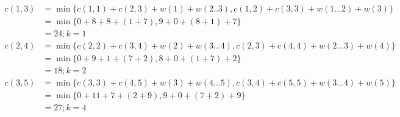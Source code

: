 \documentclass[12pt]{article}
\begin{document}
\begin{align*}
c(1,3) & = \min \{ c(1,1) + c(2,3) + w(1) + w(2..3), c(1,2) + c(3,3) + w(1...2) + w(3)\} \\
           & = \min\{ 0 + 8 + 8 + (1+7), 9 + 0 + (8+1) + 7\}\\
           & =24; k=1 \\
c(2,4) & = \min \{c(2,2) + c(3,4) + w(2) + w(3...4), c(2,3) + c(4,4) + w(2...3) + w(4)\} \\
          & = \min \{0 + 9 + 1 + (7+2), 8 + 0 + (1+7) + 2\}\\
          & = 18; k=2 \\
c(3,5) & = \min \{c(3,3) + c(4,5) + w(3) + w(4...5),  c(3,4) + c(5,5) + w(3...4) + w(5)\} \\
          &=  \min \{0 + 11 + 7 +(2 + 9), 9 + 0 + (7 + 2) + 9 \} \\
          & = 27; k=4
\end{align*}
\end{document}
